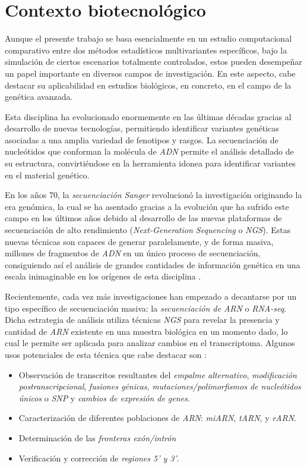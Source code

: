 \documentclass[IB,BIB]{TFUOC}%
\begin{document}
\section{Contexto biotecnológico}
\label{sec:Contexto biotecnológico}

Aunque el presente trabajo se basa esencialmente en un estudio computacional comparativo entre dos métodos estadísticos multivariantes específicos, bajo la simulación de ciertos escenarios totalmente controlados, estos pueden desempeñar un papel importante en diversos campos de investigación. En este aspecto, cabe destacar su aplicabilidad en estudios biológicos, en concreto, en el campo de la genética avanzada.

Esta disciplina ha evolucionado enormemente en las últimas décadas gracias al desarrollo de nuevas tecnologías, permitiendo identificar variantes genéticas asociadas a una amplia variedad de fenotipos y rasgos. La secuenciación de nucleótidos que conforman la molécula de \textit{ADN} permite el análisis detallado de su estructura, convirtiéndose en la herramienta idonea para identificar variantes en el material genético.

En los años 70, la \textit{secuenciación Sanger} revolucionó la investigación originando la era genómica, la cual se ha asentado gracias a la evolución que ha sufrido este campo en los últimos años debido al desarrollo de las nuevas plataformas de secuenciación de alto rendimiento (\textit{Next-Generation Sequencing} o \textit{NGS}). Estas nuevas técnicas son capaces de generar paralelamente, y de forma masiva, millones de fragmentos de \textit{ADN} en un único proceso de secuenciación, consiguiendo así el análisis de grandes cantidades de información genética en una escala inimaginable en los orígenes de esta disciplina \cite{behjati_what_2013,noauthor_next-generation_nodate}.

Recientemente, cada vez más investigaciones han empezado a decantarse por un tipo específico de secuenciación masiva: la \textit{secuenciación de ARN} o \textit{RNA-seq}. Dicha estrategia de análisis utiliza técnicas \textit{NGS} para revelar la presencia y cantidad de \textit{ARN} existente en una muestra biológica en un momento dado, lo cual le permite ser aplicada para analizar cambios en el transcriptoma. Algunos usos potenciales de esta técnica que cabe destacar son \cite{wang_rna-seq_2009} \cite{noauthor_rna-seq_2023}:

\footnotesize

\begin{itemize}
    \item Observación de transcritos resultantes del \textit{empalme alternativo}, \textit{modificación postranscripcional}, \textit{fusiones génicas}, \textit{mutaciones/polimorfismos de nucleótidos únicos} o \textit{SNP} y \textit{cambios de expresión de genes}.
    \item Caracterización de diferentes poblaciones de \textit{ARN}: \textit{miARN}, \textit{tARN}, y \textit{rARN}.
    \item Determinación de las \textit{fronteras exón/intrón}
    \item Verificación y corrección de \textit{regiones 5' y 3'}.
\end{itemize}
\end{document}
